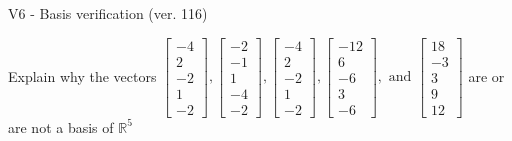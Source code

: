 \begin{exercise}
  \begin{exerciseTitle}V6 - Basis verification (ver. 116)\end{exerciseTitle}
  \begin{exerciseStatement}
    Explain why the vectors \(\left[\begin{array}{r}
-4 \\
2 \\
-2 \\
1 \\
-2
\end{array}\right] , \left[\begin{array}{r}
-2 \\
-1 \\
1 \\
-4 \\
-2
\end{array}\right] , \left[\begin{array}{r}
-4 \\
2 \\
-2 \\
1 \\
-2
\end{array}\right] , \left[\begin{array}{r}
-12 \\
6 \\
-6 \\
3 \\
-6
\end{array}\right] , \text{ and } \left[\begin{array}{r}
18 \\
-3 \\
3 \\
9 \\
12
\end{array}\right]\) are or are not a basis of \(\mathbb{R}^5\)	



\end{exerciseStatement}
\end{exercise}
